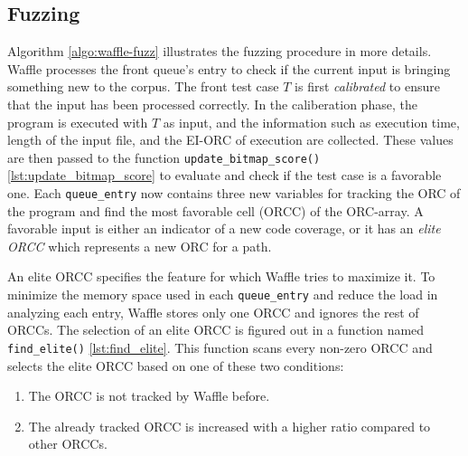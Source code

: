 \subsection{Fuzzing}
\label{sec:3-afl}






Algorithm \ref{algo:waffle-fuzz} illustrates the fuzzing procedure in more details. Waffle processes the front queue's entry to check if the current input is bringing something new to the corpus. The front test case $T$ is first \textit{calibrated} to ensure that the input has been processed correctly. In the caliberation phase, the program is executed with $T$ as input, and the information such as execution time, length of the input file, and the EI-ORC of execution are collected. These values are then passed to the function \texttt{update\_bitmap\_score()} \ref{lst:update_bitmap_score} to evaluate and check if the test case is a favorable one. Each \texttt{queue\_entry} now contains three new variables for tracking the ORC of the program and find the most favorable cell (ORCC) of the ORC-array. A favorable input is either an indicator of a new code coverage, or it has an \textit{elite ORCC} which represents a new ORC for a path. 

\begin{definition}
  An elite ORCC specifies the feature for which Waffle tries to maximize it. To minimize the memory space used in each \texttt{queue\_entry} and reduce the load in analyzing each entry, Waffle stores only one ORCC and ignores the rest of ORCCs. The selection of an elite ORCC is figured out in a function named \texttt{find\_elite()} \ref{lst:find_elite}. This function scans every non-zero ORCC and selects the elite ORCC based on one of these two conditions:
\end{definition}

\begin{enumerate}
  \item The ORCC is not tracked by Waffle before.
  \item The already tracked ORCC is increased with a higher ratio compared to other ORCCs.
\end{enumerate}



